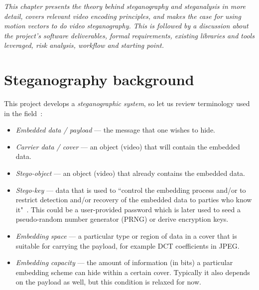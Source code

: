 \documentclass[12pt,british,twoside,notitlepage,usenames,dvipsnames,hypens,final]{report}
\numberwithin{equation}{section}
\numberwithin{figure}{section}
\begin{document}
\textit{This chapter presents the theory behind steganography and steganalysis in more detail, covers relevant video encoding principles, and makes the case for using motion vectors to do video steganography. This is followed by a discussion about the project's software deliverables, formal requirements, existing libraries and tools leveraged, risk analysis, workflow and starting point.}

\section{Steganography background}

This project develops a \emph{steganographic system}, so let us review terminology used in the field~\cite{infohiding-survey, bateman}:
\begin{itemize}
\item \emph{Embedded data / payload} --- the message that one wishes to hide.
\item \emph{Carrier data / cover} --- an object (video) that will contain the embedded data.
\item \emph{Stego-object } --- an object (video) that already contains the embedded data.
\item \emph{Stego-key} ---  data that is used to ``control the embedding process and/or to restrict detection and/or recovery of the embedded data to parties who know it"~\cite{infohiding-survey}. This could be a user-provided password which is later used to seed a pseudo-random number generator (PRNG) or derive encryption keys. 
\item \emph{Embedding space} --- a particular type or region of data in a cover that is suitable for carrying the payload, for example DCT coefficients in JPEG.
\item \emph{Embedding capacity} --- the amount of information (in bits) a particular embedding scheme can hide within a certain cover. Typically it also depends on the payload as well, but this condition is relaxed for now.
\end{itemize}
\end{document}
